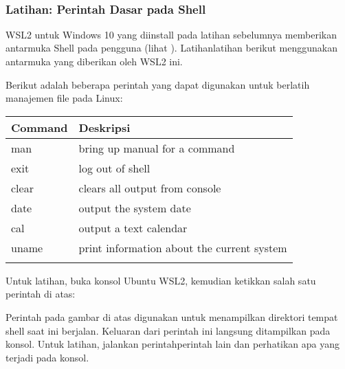 \documentclass[letterpaper,10pt,english]{sphinxmanual}
\begin{document}
 


\subsubsection{Latihan: Perintah Dasar pada Shell}
\label{\detokenize{sesi1/arsitektur:latihan-perintah-dasar-pada-shell}}
WSL2 untuk Windows 10 yang diinstall pada latihan sebelumnya memberikan antarmuka Shell pada pengguna (lihat {\hyperref[\detokenize{sesi1/pengantarlinux:wsl2}]{}}). Latihan\sphinxhyphen{}latihan berikut menggunakan antarmuka  yang diberikan oleh WSL2 ini.

Berikut adalah beberapa perintah yang dapat digunakan untuk berlatih manajemen file pada Linux:


\begin{savenotes}\sphinxattablestart
\centering
\begin{tabulary}{\linewidth}[t]{|T|T|}
\hline
\sphinxstyletheadfamily 
Command
&\sphinxstyletheadfamily 
Deskripsi
\\
\hline
man
&
bring up manual for a command
\\
\hline
exit
&
log out of shell
\\
\hline
clear
&
clears all output from console
\\
\hline
date
&
output the system date
\\
\hline
cal
&
output a text calendar
\\
\hline
uname
&
print information about the current system
\\
\hline

&

\\
\hline
\end{tabulary}
\par
\sphinxattableend\end{savenotes}

Untuk latihan, buka konsol Ubuntu WSL2, kemudian ketikkan salah satu perintah di atas:


Perintah  pada gambar di atas digunakan untuk menampilkan direktori tempat shell saat ini berjalan. Keluaran dari perintah ini langsung ditampilkan pada konsol. Untuk latihan, jalankan perintah\sphinxhyphen{}perintah lain dan perhatikan apa yang terjadi pada konsol.

 
\end{document}
